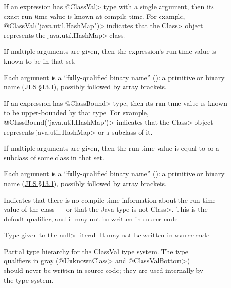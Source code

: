 \begin{description}
\item[]
If an expression has \<@ClassVal> type with a single argument,
then its exact run-time value is known at compile time.
For example, \<@ClassVal("java.util.HashMap")>
indicates that the \<Class> object represents the \<java.util.HashMap> class.

If multiple arguments are given, then the expression's run-time value is
known to be in that set.

Each argument is a ``fully-qualified binary name''
():  a primitive or binary name
(\href{https://docs.oracle.com/javase/specs/jls/se17/html/jls-13.html#jls-13.1}{JLS
  \S 13.1}), possibly followed by array brackets.

\item[]
If an expression has \<@ClassBound> type, then its run-time value is known
to be upper-bounded by that type.
For example,
\<@ClassBound("java.util.HashMap")> indicates that the \<Class> object
represents \<java.util.HashMap> or a subclass of it.

If multiple arguments are given, then the run-time value is equal to or a
subclass of some class in that set.

Each argument is a ``fully-qualified binary name''
():  a primitive or binary name
(\href{https://docs.oracle.com/javase/specs/jls/se17/html/jls-13.html#jls-13.1}{JLS
  \S 13.1}), possibly followed by array brackets.

\item[] Indicates that there is no
  compile-time information about the run-time value of the class --- or
  that the Java type is not \<Class>.
  This is the default qualifier, and it may not be written in source code.

\item[] Type given to the \<null> literal.
  It may not be written in source code.
\end{description}
\begin{figure}
\caption{Partial type hierarchy for the ClassVal type system. The type qualifiers in gray (\<@UnknownClass>
and \<@ClassValBottom>) should never be written in source code; they are used internally by the type system.}
\label{fig-classval-hierarchy}
\end{figure}

